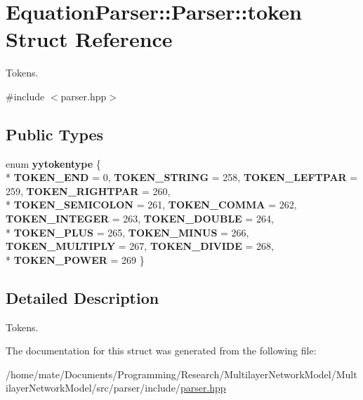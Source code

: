 \hypertarget{structEquationParser_1_1Parser_1_1token}{}\section{Equation\+Parser\+:\+:Parser\+:\+:token Struct Reference}
\label{structEquationParser_1_1Parser_1_1token}


Tokens.  




{\ttfamily \#include $<$parser.\+hpp$>$}

\subsection*{Public Types}
\begin{DoxyCompactItemize}
\item 
enum {\bfseries yytokentype} \{ \\*
{\bfseries T\+O\+K\+E\+N\+\_\+\+E\+ND} = 0, 
{\bfseries T\+O\+K\+E\+N\+\_\+\+S\+T\+R\+I\+NG} = 258, 
{\bfseries T\+O\+K\+E\+N\+\_\+\+L\+E\+F\+T\+P\+AR} = 259, 
{\bfseries T\+O\+K\+E\+N\+\_\+\+R\+I\+G\+H\+T\+P\+AR} = 260, 
\\*
{\bfseries T\+O\+K\+E\+N\+\_\+\+S\+E\+M\+I\+C\+O\+L\+ON} = 261, 
{\bfseries T\+O\+K\+E\+N\+\_\+\+C\+O\+M\+MA} = 262, 
{\bfseries T\+O\+K\+E\+N\+\_\+\+I\+N\+T\+E\+G\+ER} = 263, 
{\bfseries T\+O\+K\+E\+N\+\_\+\+D\+O\+U\+B\+LE} = 264, 
\\*
{\bfseries T\+O\+K\+E\+N\+\_\+\+P\+L\+US} = 265, 
{\bfseries T\+O\+K\+E\+N\+\_\+\+M\+I\+N\+US} = 266, 
{\bfseries T\+O\+K\+E\+N\+\_\+\+M\+U\+L\+T\+I\+P\+LY} = 267, 
{\bfseries T\+O\+K\+E\+N\+\_\+\+D\+I\+V\+I\+DE} = 268, 
\\*
{\bfseries T\+O\+K\+E\+N\+\_\+\+P\+O\+W\+ER} = 269
 \}\hypertarget{structEquationParser_1_1Parser_1_1token_a5696bebf3a1264ccfc2cf7c9a05a01c6}{}\label{structEquationParser_1_1Parser_1_1token_a5696bebf3a1264ccfc2cf7c9a05a01c6}

\end{DoxyCompactItemize}


\subsection{Detailed Description}
Tokens. 

The documentation for this struct was generated from the following file\+:\begin{DoxyCompactItemize}
\item 
/home/mate/\+Documents/\+Programming/\+Research/\+Multilayer\+Network\+Model/\+Multilayer\+Network\+Model/src/parser/include/\hyperlink{parser_8hpp}{parser.\+hpp}\end{DoxyCompactItemize}
